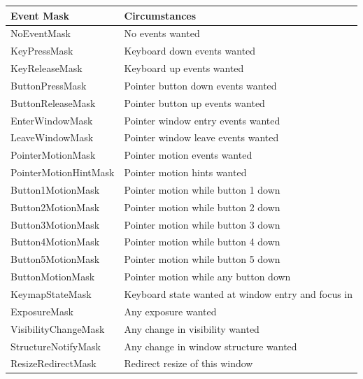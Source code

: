 \documentclass{report}
\begin{document}
\begin{itemize}
            \begin{center}
                \begin{tabularx}{\textwidth}{@{}lX@{}}
                    \toprule
                    \textbf{Event Mask}& \textbf{Circumstances} \\
                    \midrule
                    NoEventMask& No events wanted\\[2ex]
                    KeyPressMask& Keyboard down events wanted\\[2ex]
                    KeyReleaseMask& Keyboard up events wanted\\[2ex]
                    ButtonPressMask& Pointer button down events wanted\\[2ex]
                    ButtonReleaseMask& Pointer button up events wanted\\[2ex]
                    EnterWindowMask& Pointer window entry events wanted\\[2ex]
                    LeaveWindowMask& Pointer window leave events wanted\\[2ex]
                    PointerMotionMask& Pointer motion events wanted\\[2ex]
                    PointerMotionHintMask& Pointer motion hints wanted\\[2ex]
                    Button1MotionMask& Pointer motion while button 1 down\\[2ex]
                    Button2MotionMask& Pointer motion while button 2 down\\[2ex]
                    Button3MotionMask& Pointer motion while button 3 down\\[2ex]
                    Button4MotionMask& Pointer motion while button 4 down\\[2ex]
                    Button5MotionMask& Pointer motion while button 5 down\\[2ex]
                    ButtonMotionMask& Pointer motion while any button down\\[2ex]
                    KeymapStateMask& Keyboard state wanted at window entry and focus in\\[2ex]
                    ExposureMask& Any exposure wanted\\[2ex]
                    VisibilityChangeMask& Any change in visibility wanted\\[2ex]
                    StructureNotifyMask& Any change in window structure wanted\\[2ex]
                    ResizeRedirectMask& Redirect resize of this window\\[2ex]

\end{tabularx}
\end{center}
\end{itemize}
\end{document}
